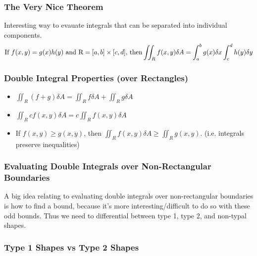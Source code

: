 \documentclass{article}
\begin{document}
\subsubsection{The Very Nice Theorem}

Interesting way to evauate integrals that can be separated into individual components.
$$\text{If } f(x, y) = g(x)h(y) \text{ and R} = [a, b] \times [c, d] \text{, then} \\ \iint_{R} f(x, y) \delta A = \int_{a}^{b} g(x) \delta x \int_{c}^{d} h(y) \delta y $$

\subsubsection{Double Integral Properties (over Rectangles)}

\begin{itemize}
    \item  $\iint_{R} (f + g) \delta A = \iint_{R} f \delta A + \iint_{R} g \delta A$
    \item $\iint_{R} cf(x,y) \delta A = c \iint_{R} f(x, y) \delta A$
    \item If $f(x, y) \ge g(x, y)$, then $\iint_{R} f(x, y) \delta A \ge \iint_{R} g(x, y)$. (i.e. integrals preserve inequalities)
\end{itemize}

\subsubsection{Evaluating Double Integrals over Non-Rectangular Boundaries}

A big idea relating to evaluating double integrals over non-rectangular boundaries is how to find a bound, because it's more interesting/difficult to do so with these odd bounds. Thus we need to differential between type 1, type 2, and non-typal shapes.

\subsubsection{Type 1 Shapes vs Type 2 Shapes}
\end{document}
